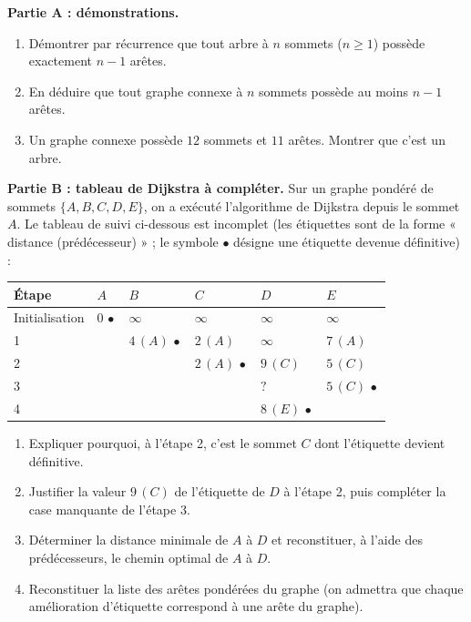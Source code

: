 \documentclass[11pt]{article}
\begin{document}
\begin{exercice}
\textbf{Partie A : démonstrations.}
\begin{enumerate}
\item Démontrer par récurrence que tout arbre à $n$ sommets ($n \geq 1$) possède exactement $n-1$ arêtes.
\item En déduire que tout graphe connexe à $n$ sommets possède au moins $n-1$ arêtes.
\item Un graphe connexe possède $12$ sommets et $11$ arêtes. Montrer que c'est un arbre.
\end{enumerate}
\textbf{Partie B : tableau de Dijkstra à compléter.}
Sur un graphe pondéré de sommets $\{A, B, C, D, E\}$, on a exécuté l'algorithme de Dijkstra depuis le sommet $A$. Le tableau de suivi ci-dessous est incomplet (les étiquettes sont de la forme « distance (prédécesseur) » ; le symbole $\bullet$ désigne une étiquette devenue définitive) :
\begin{center}
\begin{tabularx}{\linewidth}{|l|X|X|X|X|X|}
\hline
\rowcolor{popblueL} Étape & $A$ & $B$ & $C$ & $D$ & $E$ \\
\hline
Initialisation & $0\,\bullet$ & $\infty$ & $\infty$ & $\infty$ & $\infty$ \\
\hline
1 & & $4\,(A)\,\bullet$ & $2\,(A)$ & $\infty$ & $7\,(A)$ \\
\hline
2 & & & $2\,(A)\,\bullet$ & $9\,(C)$ & $5\,(C)$ \\
\hline
3 & & & & $?$ & $5\,(C)\,\bullet$ \\
\hline
4 & & & & $8\,(E)\,\bullet$ & \\
\hline
\end{tabularx}
\end{center}
\begin{enumerate}
\item Expliquer pourquoi, à l'étape 2, c'est le sommet $C$ dont l'étiquette devient définitive.
\item Justifier la valeur $9\,(C)$ de l'étiquette de $D$ à l'étape 2, puis compléter la case manquante de l'étape 3.
\item Déterminer la distance minimale de $A$ à $D$ et reconstituer, à l'aide des prédécesseurs, le chemin optimal de $A$ à $D$.
\item Reconstituer la liste des arêtes pondérées du graphe (on admettra que chaque amélioration d'étiquette correspond à une arête du graphe).
\end{enumerate}
\end{exercice}
\end{document}

